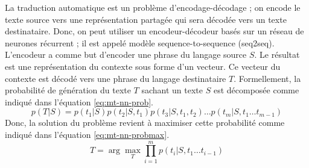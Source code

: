 \documentclass{KodeBook}
\begin{document}
La traduction automatique est un problème d'encodage-décodage ; on encode le texte source vers une représentation partagée qui sera décodée vers un texte destinataire.
Donc, on peut utiliser un encodeur-décodeur basés sur un réseau de neurones récurrent ; il est appelé modèle sequence-to-sequence (seq2seq).
L'encodeur a comme but d'encoder une phrase du langage source $S$. Le résultat est une représentation du contexte sous forme d'un vecteur. 
Ce vecteur du contexte est décodé vers une phrase du langage destinataire $T$. 
Formellement, la probabilité de génération du texte $T$ sachant un texte $S$ est décomposée comme indiqué dans l'équation \ref{eq:mt-nn-prob}.
\begin{equation}\label{eq:mt-nn-prob}
p(T|S) = p(t_1|S) p(t_2|S, t_1) p(t_3|S, t_1, t_2)\ldots p(t_m|S, t_1\ldots t_{m-1})
\end{equation}
Donc, la solution du problème  revient à maximiser cette probabilité comme indiqué dans l'équation \ref{eq:mt-nn-probmax}.
\begin{equation}\label{eq:mt-nn-probmax}
\hat{T} = \arg\max_{T} \prod_{i=1}^{m} p(t_i | S, t_1\ldots t_{i-1})
\end{equation}
\end{document}

